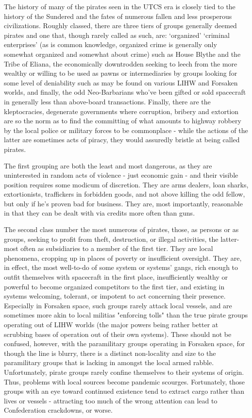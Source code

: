 The history of many of the pirates seen in the UTCS era is closely
tied to the history of the Sundered and the fates of numerous fallen
and less prosperous civilizations. Roughly classed, there are three
tiers of groups generally deemed pirates and one that, though rarely
called as such, are: `organized' `criminal enterprises' (as is common
knowledge, organized crime is generally only somewhat organized and
somewhat about crime) such as House Blythe and the Tribe of Eliana,
the economically downtrodden seeking to leech from the more wealthy or
willing to be used as pawns or intermediaries by groups looking for
some level of deniability such as may be found on various LIHW and
Forsaken worlds, and finally, the odd Neo-Barbarians who've been
gifted or sold spacecraft in generally less than above-board
transactions.  Finally, there are the kleptocracies, degenerate
governments where corruption, bribery and extortion are so the norm as
to find the committing of what amounts to highway robbery by the local
police or military forces to be commonplace - while the actions of the
latter are sometimes acts of piracy, they would assuredly bristle at
being called pirates.

The first grouping are both the least and most dangerous, as they are
uninterested in random acts of violence - just economic gain - and
their visible position requires some modicum of discretion. They are
arms dealers, loan sharks, extortionists, traffickers in forbidden
goods, and not above killing the odd fellow, but only if he's proven
bad for business.  They are, most importantly, reasonable in that they
can be dealt with via credits more often than guns.

The second class number the most numerous of pirates, those, as
persons or as groups, seeking to profit from theft, destruction, or
illegal activities, the latter-most often as subsidiaries to a member
of the first tier. They are local phenomena, cropping up in places of
poverty or insufficient oversight. They are, in effect, the most
well-to-do of some system or systems' gangs, rich enough to outfit
themselves with spacecraft in the first place, insufficiently wealthy
or powerful to become organized competitors to the first tier, and
existing in systems welcoming, tolerant, or impotent to act concerning
their presence. Especially in Forsaken space, such groups rarely
attack local vessels, and are sometimes more akin to local militias
"enforcing tolls" than the true pirate groups operating out of LIHW
worlds (the major powers being rather better at scrubbing bases of
operation out of their own systems). These should not be confused,
however, with the paramilitary groups operating in Forsaken space, for
though the line is blurry, there is a distinct non-locality and size
to the paramilitary groups that is lacking in amongst the local armed
rabble. Unfortunately, pirate groups rarely confine themselves to
their systems of origin. Thus, problems with local sources become
pandemic scourges. Fortunately, those groups with an eye toward
continued existence tend to extract cargo rather than lives or vessels
- attracting too much of the wrong attention can lead to Confederation
crackdowns, or worse.

